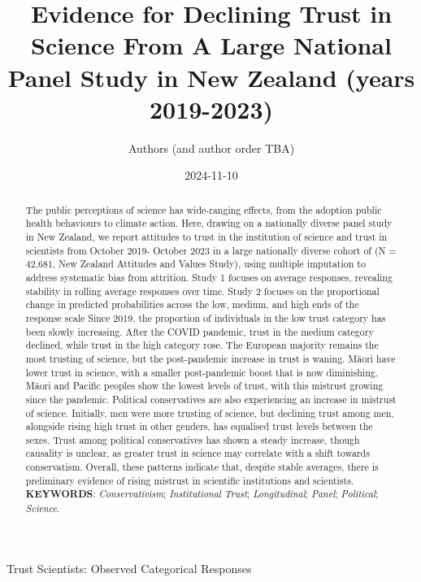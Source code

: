 \documentclass[
  single column]{article}
\title{Evidence for Declining Trust in Science From A Large National
Panel Study in New Zealand (years 2019-2023)}
\author{Authors (and author order TBA)}
\affil{%
             \small{     New Zealand
          ORCID \textcolor[HTML]{A6CE39}{\aiOrcid} ~0000-0003-3169-6576 }
              }
\date{2024-11-10}
\makeatletter
\let\oldparagraph\paragraph
\renewcommand{\paragraph}{
    \@ifstar
      \xxxParagraphStar
      \xxxParagraphNoStar
  }
\newcommand{\xxxParagraphStar}[1]{\oldparagraph*{#1}\mbox{}}
\newcommand{\xxxParagraphNoStar}[1]{\oldparagraph{#1}\mbox{}}
\makeatother
\begin{document}
\maketitle
\begin{abstract}
The public perceptions of science has wide-ranging effects, from the
adoption public health behaviours to climate action. Here, drawing on a
nationally diverse panel study in New Zealand, we report attitudes to
trust in the institution of science and trust in scientists from October
2019- October 2023 in a large nationally diverse cohort of (N = 42,681,
New Zealand Attitudes and Values Study), using multiple imputation to
address systematic bias from attrition. Study 1 focuses on average
responses, revealing stability in rolling average responses over time.
Study 2 focuses on the proportional change in predicted probabilities
across the low, medium, and high ends of the response scale Since 2019,
the proportion of individuals in the low trust category has been slowly
increasing. After the COVID pandemic, trust in the medium category
declined, while trust in the high category rose. The European majority
remains the most trusting of science, but the post-pandemic increase in
trust is waning. Māori have lower trust in science, with a smaller
post-pandemic boost that is now diminishing. Māori and Pacific peoples
show the lowest levels of trust, with this mistrust growing since the
pandemic. Political conservatives are also experiencing an increase in
mistrust of science. Initially, men were more trusting of science, but
declining trust among men, alongside rising high trust in other genders,
has equalised trust levels between the sexes. Trust among political
conservatives has shown a steady increase, though causality is unclear,
as greater trust in science may correlate with a shift towards
conservatism. Overall, these patterns indicate that, despite stable
averages, there is preliminary evidence of rising mistrust in scientific
institutions and scientists. \textbf{KEYWORDS}: \emph{Conservativism};
\emph{Institutional Trust}; \emph{Longitudinal}; \emph{Panel};
\emph{Political}; \emph{Science}.
\end{abstract}


\paragraph{Trust Scientists: Observed Categorical
Responses}\label{trust-scientists-observed-categorical-responses}
\end{document}
